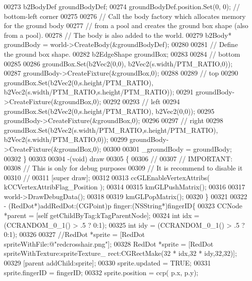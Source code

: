 \begin{DoxyCode}
{{{{{{00273     b2BodyDef groundBodyDef;
00274     groundBodyDef.position.Set(0, 0); \textcolor{comment}{// bottom-left corner}
00275     
00276     \textcolor{comment}{// Call the body factory which allocates memory for the ground body}
00277     \textcolor{comment}{// from a pool and creates the ground box shape (also from a pool).}
00278     \textcolor{comment}{// The body is also added to the world.}
00279     b2Body* groundBody = world->CreateBody(&groundBodyDef);
00280     
00281     \textcolor{comment}{// Define the ground box shape.}
00282     b2EdgeShape groundBox;      
00283     
00284     \textcolor{comment}{// bottom}
00285     
00286     groundBox.Set(b2Vec2(0,0), b2Vec2(s.width/PTM\_RATIO,0));
00287     groundBody->CreateFixture(&groundBox,0);
00288     
00289     \textcolor{comment}{// top}
00290     groundBox.Set(b2Vec2(0,s.height/PTM\_RATIO), b2Vec2(s.width/PTM\_RATIO,s.height/PTM\_RATIO));
00291     groundBody->CreateFixture(&groundBox,0);
00292     
00293     \textcolor{comment}{// left}
00294     groundBox.Set(b2Vec2(0,s.height/PTM\_RATIO), b2Vec2(0,0));
00295     groundBody->CreateFixture(&groundBox,0);
00296     
00297     \textcolor{comment}{// right}
00298     groundBox.Set(b2Vec2(s.width/PTM\_RATIO,s.height/PTM\_RATIO), b2Vec2(s.width/PTM\_RATIO,0));
00299     groundBody->CreateFixture(&groundBox,0);
00300     
00301     \_groundBody = groundBody;
00302 \}
00303 
00304 -(void) draw
00305 \{
00306     \textcolor{comment}{//}
00307     \textcolor{comment}{// IMPORTANT:}
00308     \textcolor{comment}{// This is only for debug purposes}
00309     \textcolor{comment}{// It is recommend to disable it}
00310     \textcolor{comment}{//}
00311     [\textcolor{keyword}{super} draw];
00312     
00313     ccGLEnableVertexAttribs( kCCVertexAttribFlag\_Position );
00314     
00315     kmGLPushMatrix();
00316     
00317     world->DrawDebugData(); 
00318     
00319     kmGLPopMatrix();
00320 \}
00321 
00322 - (RedDot*)addRedDot:(CGPoint)p finger:(NSString*)fingerID\{
00323     CCNode *parent = [\textcolor{keyword}{self} getChildByTag:kTagParentNode];
00324     \textcolor{keywordtype}{int} idx = (CCRANDOM\_0\_1() > .5 ? 0:1);
00325     \textcolor{keywordtype}{int} idy = (CCRANDOM\_0\_1() > .5 ? 0:1);
00326     
00327     \textcolor{comment}{//RedDot *sprite = [RedDot spriteWithFile:@"redcrosshair.png"];}
00328     RedDot *sprite = [RedDot spriteWithTexture:spriteTexture\_ rect:CGRectMake(32 * idx,32 * idy,32,32)];        
00329     [parent addChild:sprite];
00330     sprite.updated = TRUE;
00331     sprite.fingerID = fingerID;
00332     sprite.position = ccp( p.x, p.y);
}}}}}}
\end{DoxyCode}
